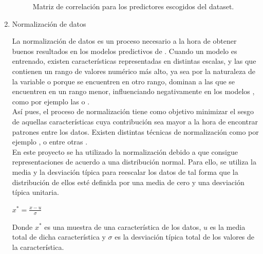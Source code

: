 \begin{enumerate}
                    \begin{figure}[H]
                        \centering
                        
                        \caption{Matriz de correlación para los predictores escogidos del dataset.}
                        \label{CorrelationMatrixImage}
                     \end{figure}


                \item Normalización de datos

                    La normalización de datos es un proceso necesario a la hora de obtener buenos resultados en los modelos predictivos de . Cuando un modelo es entrenado, existen características representadas en distintas escalas, y las que contienen un rango de valores numérico más alto, ya sea por la naturaleza de la variable o porque se encuentren en otro rango, dominan a las que se encuentren en un rango menor, influenciando negativamente en los modelos , como por ejemplo las  o  \cite{NormalizationSensitiveModels}.\\

                    Así pues, el proceso de normalización tiene como objetivo minimizar el sesgo de aquellas características cuya contribución sea mayor a la hora de encontrar patrones entre los datos. Existen distintas técnicas de normalización como por ejemplo ,  o  entre otras \cite{DataNormalizationInvestigation}.\\


                    En este proyecto se ha utilizado la normalización  debido a que consigue representaciones de acuerdo a una distribución normal. Para ello, se utiliza la media y la desviación típica para reescalar los datos de tal forma que la distribución de ellos esté definida por una media de cero y una desviación típica unitaria.\\

                   \begin{center}
                        $x^* = \frac{x - u}{\sigma}$
                    \end{center}


                    Donde $x^*$ es una muestra de una característica de los datos, $u$ es la media total de dicha característica y $\sigma$ es la desviación típica total de los valores de la característica.


\end{enumerate}
